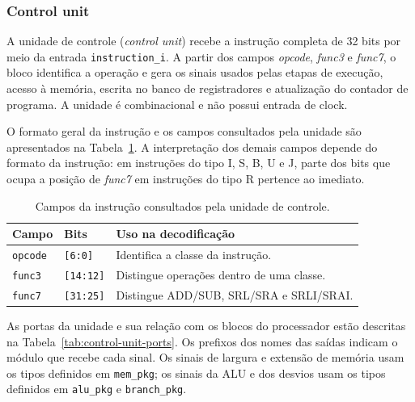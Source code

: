 \subsubsection{Control unit}
\label{subsub:control_unit}



A unidade de controle (\textit{control unit}) recebe a instrução completa de 32 bits por meio da entrada \texttt{instruction\_i}. A partir dos campos \textit{opcode}, \textit{func3} e \textit{func7}, o bloco identifica a operação e gera os sinais usados pelas etapas de execução, acesso à memória, escrita no banco de registradores e atualização do contador de programa. A unidade é combinacional e não possui entrada de clock.

O formato geral da instrução e os campos consultados pela unidade são apresentados na Tabela~\ref{tab:control-unit-fields}. A interpretação dos demais campos depende do formato da instrução: em instruções do tipo I, S, B, U e J, parte dos bits que ocupa a posição de \textit{func7} em instruções do tipo R pertence ao imediato.

\begin{table}[!htb]
\centering
\caption{Campos da instrução consultados pela unidade de controle.}
\label{tab:control-unit-fields}
\begin{tabular}{lll}
\toprule
\textbf{Campo} & \textbf{Bits} & \textbf{Uso na decodificação} \\
\midrule
\texttt{opcode} & \texttt{[6:0]} & Identifica a classe da instrução. \\
\texttt{func3} & \texttt{[14:12]} & Distingue operações dentro de uma classe. \\
\texttt{func7} & \texttt{[31:25]} & Distingue ADD/SUB, SRL/SRA e SRLI/SRAI. \\
\bottomrule
\end{tabular}
\end{table}

As portas da unidade e sua relação com os blocos do processador estão descritas na Tabela~\ref{tab:control-unit-ports}. Os prefixos dos nomes das saídas indicam o módulo que recebe cada sinal. Os sinais de largura e extensão de memória usam os tipos definidos em \texttt{mem\_pkg}; os sinais da ALU e dos desvios usam os tipos definidos em \texttt{alu\_pkg} e \texttt{branch\_pkg}.

